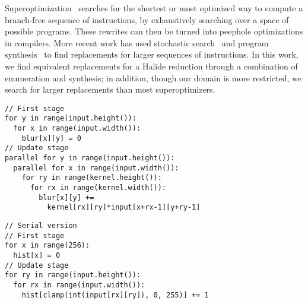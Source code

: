 Superoptimization~\cite{Granlund:1992:EBU:143095.143146, Massalin:1987:SLS:36206.36194} searches for the shortest or most optimized way to compute a branch-free sequence of instructions, by exhaustively searching over a space of possible programs. These rewrites can then be turned into peephole optimizations in compilers. More recent work has used stochastic search~\cite{Phothilimthana:2016:SUS:2872362.2872387, Schkufza:2013:SS:2490301.2451150} and program synthesis~\cite{Lopes:2015:PCP:2737924.2737965} to find replacements for larger sequences of instructions.
In this work, we find equivalent replacements for a Halide reduction through a combination of enumeration and synthesis; in addition, though our domain is more restricted, we search for larger replacements than most superoptimizers.

\begin{lstlisting}[caption={Convolution blur kernel is easily parallelizable across \code{Var} $x$ adn $y$.}, label={lst:blur_loopness}]
// First stage
for y in range(input.height()):
  for x in range(input.width()):
    blur[x][y] = 0
// Update stage
parallel for y in range(input.height()):
  parallel for x in range(input.width()):
    for ry in range(kernel.height()):
      for rx in range(kernel.width()):    
        blur[x][y] += 
          kernel[rx][ry]*input[x+rx-1][y+ry-1] 
\end{lstlisting}

\begin{lstlisting}[caption={Histogram of an image is hard to parallelize since its update stage does not involve \code{RVar}s.}, label={lst:histogram_loopness}]
// Serial version
// First stage
for x in range(256):
  hist[x] = 0
// Update stage
for ry in range(input.height()):
  for rx in range(input.width()):
    hist[clamp(int(input[rx][ry]), 0, 255)] += 1
\end{lstlisting}

